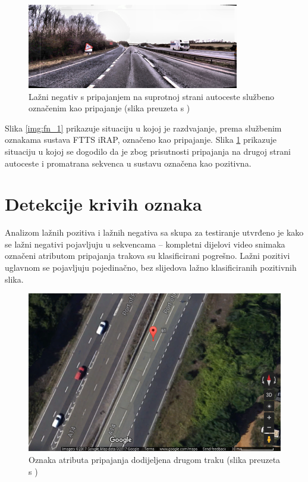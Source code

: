 \documentclass[times, utf8, diplomski, numeric]{fer}
\begin{document}
\begin{figure}[H]
\centering
\includegraphics[scale=1]{images/fn_2.png}
\caption{Lažni negativ s pripajanjem na suprotnoj strani autoceste službeno označenim kao pripajanje (slika preuzeta s \citep{url:ftts_irap})}
\label{img:fn_2}
\end{figure}

Slika \ref{img:fn_1} prikazuje situaciju u kojoj je razdvajanje, prema službenim oznakama sustava FTTS iRAP, označeno kao pripajanje. 
Slika \ref{img:fn_2} prikazuje situaciju u kojoj se dogodilo da je zbog prisutnosti pripajanja na drugoj strani autoceste i promatrana sekvenca u sustavu označena kao pozitivna.

\section{Detekcije krivih oznaka}
Analizom lažnih pozitiva i lažnih negativa sa skupa za testiranje utvrđeno je kako se lažni negativi pojavljuju u sekvencama -- kompletni dijelovi video snimaka označeni atributom pripajanja trakova su klasificirani pogrešno.
Lažni pozitivi uglavnom se pojavljuju pojedinačno, bez slijedova lažno klasificiranih pozitivnih slika.

\begin{figure}[H]
\centering
\includegraphics[scale=0.5]{images/wrong_lane_label.png}
\caption{Oznaka atributa pripajanja dodijeljena drugom traku (slika preuzeta s \citep{url:google_maps})}
\label{img:wrong_lane_label}
\end{figure}
\end{document}
